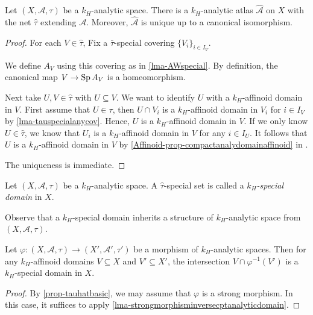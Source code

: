 \begin{proposition}
    Let  $(X,\mathcal{A},\tau)$ be a $k_H$-analytic space. There is a $k_H$-analytic atlas $\hat{\mathcal{A}}$ on $X$ with the net $\hat{\tau}$ extending $\mathcal{A}$. Moreover, $\hat{\mathcal{A}}$ is unique up to a canonical isomorphism.
\end{proposition}
\begin{proof}
    For each $V\in \hat{\tau}$, Fix a $\bar{\tau}$-special covering $\{V_i\}_{i\in I_V}$.
    
    We define $A_V$ using this covering as in \cref{lma-AWspecial}. By definition, the canonical map $V\rightarrow \operatorname{Sp} A_V$ is a homeomorphism.

    Next take $U,V\in \hat{\tau}$ with $U\subseteq V$. We want to identify $U$ with a $k_H$-affinoid domain in $V$. First assume that $U\in \tau$, then $U\cap V_i$ is a $k_H$-affinoid domain in $V_i$ for $i\in I_V$ by \cref{lma-tauspecialanycov}. Hence, $U$ is a $k_H$-affinoid domain in $V$. If we only know $U\in \hat{\tau}$,  we know that $U_i$ is a $k_H$-affinoid domain in $V$ for any $i\in I_U$. It follows that $U$ is a $k_H$-affinoid domain in $V$ by \cref{Affinoid-prop-compactanalydomainaffinoid} in .
    
    The uniqueness is immediate.
\end{proof}

\begin{definition}
    Let  $(X,\mathcal{A},\tau)$ be a $k_H$-analytic space. A $\hat{\tau}$-special set is called a \emph{$k_H$-special domain} in $X$.
\end{definition}
Observe that a $k_H$-special domain inherits a structure of $k_H$-analytic space from $(X,\mathcal{A},\tau)$.

\begin{proposition}
    Let $\varphi:(X,\mathcal{A},\tau)\rightarrow (X',\mathcal{A}',\tau')$ be a morphism of $k_H$-analytic spaces. Then for any $k_H$-affinoid domains $V\subseteq X$ and $V'\subseteq X'$, the intersection $V\cap \varphi^{-1}(V')$ is a $k_H$-special domain in $X$.
\end{proposition}
\begin{proof}
    By \cref{prop-tauhatbasic}, we may assume that $\varphi$ is a strong morphism. In this case, it suffices to apply \cref{lma-strongmorphisminversecptanalyticdomain}.
\end{proof}

